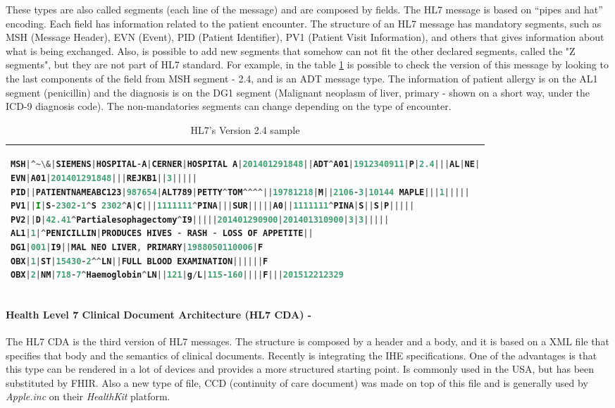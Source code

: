 \documentclass[mim_thesis.tex]{subfiles}
\begin{document}
These types are also called segments (each line of the message) and are composed by fields. The HL7 message is based on “pipes and hat” encoding. Each field has information related to the patient encounter. The structure of an HL7 message has mandatory segments, such as MSH (Message Header), EVN (Event), PID (Patient Identifier), PV1 (Patient Visit Information), and others that gives information about what is being exchanged. Also, is possible to add new segments that somehow can not fit the other declared segments, called the "Z segments", but they are not part of HL7 standard. For example, in the table \ref{tab:hl7_2_4} is possible to check the version of this message by looking to the last components of the field from MSH segment - 2.4, and is an ADT message type. The information of patient allergy is on the AL1 segment (penicillin) and the diagnosis is on the DG1 segment (Malignant neoplasm of liver, primary - shown on a short way, under the ICD-9 diagnosis code). The non-mandatories segments can change depending on the type of encounter.


\begin{table}[H]
\caption{HL7’s Version 2.4 sample}
\label{tab:hl7_2_4}
\begin{tabular}{l}
\toprule[2pt]
\begin{lstlisting}[language=octave]
MSH|^~\&|SIEMENS|HOSPITAL-A|CERNER|HOSPITAL A|201401291848||ADT^A01|1912340911|P|2.4|||AL|NE|
EVN|A01|201401291848|||REJKB1||3|||||
PID||PATIENTNAMEABC123|987654|ALT789|PETTY^TOM^^^^||19781218|M||2106-3|10144 MAPLE|||1|||||
PV1||I|S-2302-1^S 2302^A|C|||1111111^PINA|||SUR|||||A0||1111111^PINA|S||S|P|||||
PV2||D|42.41^Partialesophagectomy^I9|||||201401290900|201401310900|3|3|||||
AL1|1|^PENICILLIN|PRODUCES HIVES - RASH - LOSS OF APPETITE||
DG1|001|I9||MAL NEO LIVER, PRIMARY|1988050110006|F
OBX|1|ST|15430-2^^LN||FULL BLOOD EXAMINATION||||||F
OBX|2|NM|718-7^Haemoglobin^LN||121|g/L|115-160||||F|||201512212329
\end{lstlisting}
\tabularnewline \bottomrule[2pt]
\end{tabular}
\end{table}

\paragraph{\textbf{Health Level 7 Clinical Document Architecture (HL7 CDA) -}}
The HL7 CDA is the third version of HL7 messages. The structure is composed by a header and a body, and it is based on a XML file that specifies that body and the semantics
of clinical documents. Recently is integrating the \ac{IHE} specifications. One of the advantages is that this type can be rendered in a lot of devices and provides a more structured starting point. Is commonly used in the USA, but has been substituted by FHIR. Also a new type of file, CCD (continuity of care document) was made on top of this file and is generally used by \textit{Apple.inc} on their \textit{HealthKit} platform.\\
\end{document}
